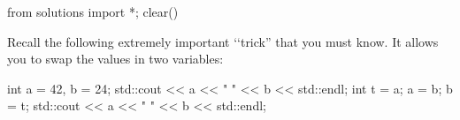 \begin{python0}
from solutions import *; clear()
\end{python0}

Recall the following extremely important \lq\lq trick'' that you must know.
It allows you to swap the values in two variables:
\begin{console}
int a = 42, b = 24;
std::cout << a << " " << b << std::endl;
int t = a;
a = b;
b = t;
std::cout << a << " " << b << std::endl;
\end{console}


